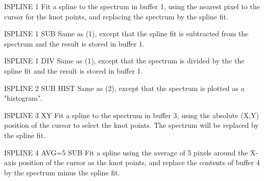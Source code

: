 {\newpage\clearpage
{}%
\begin{example} 
  \item[ISPLINE 1 \hfill]{Fit a spline to the spectrum in buffer 1, using
       the nearest pixel to the cursor for the knot points, and replacing
       the spectrum by the spline fit.}
\par
\item[ISPLINE 1 SUB\hfill]{Same as (1), except that the spline fit is
       subtracted from the spectrum and the result is stored in buffer 1.}
\par
\item[ISPLINE 1 DIV \hfill]{Same as (1), except that the spectrum is
       divided by the the spline fit and the result is stored in buffer 1.}
\par
\item[ISPLINE 2 SUB HIST\hfill]{Same as (2), except that the spectrum is
       plotted as a "histogram".}
\par
\item[ISPLINE 3 XY\hfill]{Fit a spline to the spectrum in buffer 3, using
       the absolute (X,Y) position of the cursor to select the knot points.
       The spectrum will be replaced by the spline fit.}
\par
\item[ISPLINE 4 AVG=5 SUB\hfill]{Fit a spline using the average of 5
       pixels around the X-axis position of the cursor as the knot points,
       and replace the contents of buffer 4 by the spectrum minus the
       spline fit.}
\end{example}%
\lthtmlfigureZ
\lthtmlcheckvsize\clearpage}

